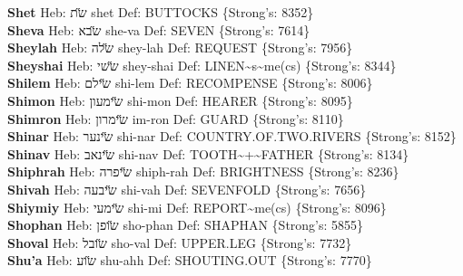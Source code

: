 {\textbf{Shet} Heb: {\large\H שת} shet Def: BUTTOCKS \{Strong's: 8352\}\hfill{}\\

\textbf{Sheva} Heb: {\large\H שבא} she-va Def: SEVEN \{Strong's: 7614\}\hfill{}\\

\textbf{Sheylah} Heb: {\large\H שלה} shey-lah Def: REQUEST \{Strong's: 7956\}\hfill{}\\

\textbf{Sheyshai} Heb: {\large\H ששי} shey-shai Def: LINEN\textasciitilde{}s\textasciitilde{}me(cs) \{Strong's: 8344\}\hfill{}\\

\textbf{Shilem} Heb: {\large\H שילם} shi-lem Def: RECOMPENSE \{Strong's: 8006\}\hfill{}\\

\textbf{Shimon} Heb: {\large\H שימעון} shi-mon Def: HEARER \{Strong's: 8095\}\hfill{}\\

\textbf{Shimron} Heb: {\large\H שימרון} im-ron Def: GUARD \{Strong's: 8110\}\hfill{}\\

\textbf{Shinar} Heb: {\large\H שינער} shi-nar Def: COUNTRY.OF.TWO.RIVERS \{Strong's: 8152\}\hfill{}\\

\textbf{Shinav} Heb: {\large\H שינאב} shi-nav Def: TOOTH\textasciitilde{}+\textasciitilde{}FATHER \{Strong's: 8134\}\hfill{}\\

\textbf{Shiphrah} Heb: {\large\H שיפרה} shiph-rah Def: BRIGHTNESS \{Strong's: 8236\}\hfill{}\\

\textbf{Shivah} Heb: {\large\H שיבעה} shi-vah Def: SEVENFOLD \{Strong's: 7656\}\hfill{}\\

\textbf{Shiymiy} Heb: {\large\H שימעי} shi-mi Def: REPORT\textasciitilde{}me(cs) \{Strong's: 8096\}\hfill{}\\

\textbf{Shophan} Heb: {\large\H שופן} sho-phan Def: SHAPHAN \{Strong's: 5855\}\hfill{}\\

\textbf{Shoval} Heb: {\large\H שובל} sho-val Def: UPPER.LEG \{Strong's: 7732\}\hfill{}\\

\textbf{Shu'a} Heb: {\large\H שוע} shu-ahh Def: SHOUTING.OUT \{Strong's: 7770\}\hfill{}\\

}
